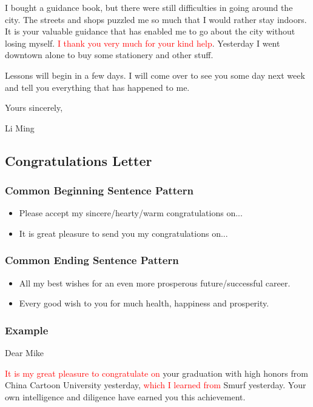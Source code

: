 \documentclass{article}
\begin{document}
\par I bought a guidance book, but there were still difficulties in going around the
city. The streets and shops puzzled me so much that I would rather stay indoors. It is
your valuable guidance that has enabled me to go about the city without losing
myself. \textcolor{red}{I thank you very much for your kind help}. Yesterday I went
downtown alone to buy some stationery and other stuff.

\par Lessons will begin in a few days. I will come over to see you some day next week and
tell you everything that has happened to me.

\hfill Yours sincerely,

\hfill Li Ming


\subsection{Congratulations Letter}
\label{sec:letter}

\subsubsection{Common Beginning Sentence Pattern}
\label{sec:comm-begnn-sent}
\begin{itemize}
\item Please accept my sincere/hearty/warm congratulations on...
\item It is great pleasure to send you my congratulations on...
\end{itemize}

\subsubsection{Common Ending Sentence Pattern}
\label{sec:comm-ending-sent-2}
\begin{itemize}
\item All my best wishes for an even more prosperous future/successful career.
\item Every good wish to you for much health, happiness and prosperity.
\end{itemize}

\subsubsection{Example}
\label{sec:example-2}
Dear Mike
\par \textcolor{red}{It is my great pleasure to congratulate on} your graduation with high
honors from China Cartoon University yesterday, \textcolor{red}{which I learned from}
Smurf yesterday. Your own intelligence and diligence have earned you this achievement.
\end{document}
